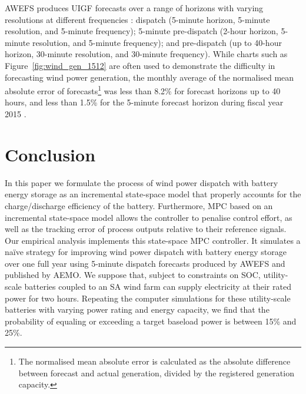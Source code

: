 AWEFS produces UIGF forecasts over a range of horizons with varying resolutions at different frequencies \citeyearpar[AEMO,][]{AEMO14b}: dispatch (5-minute horizon, 5-minute resolution, and 5-minute frequency); 5-minute pre-dispatch (2-hour horizon, 5-minute resolution, and 5-minute frequency); and pre-dispatch (up to 40-hour horizon, 30-minute resolution, and 30-minute frequency).  While charts such as Figure~\ref{fig:wind_gen_1512} are often used to demonstrate the difficulty in forecasting wind power generation, the monthly average of the normalised mean absolute error of forecasts\footnote{
The normalised mean absolute error is calculated as the absolute difference between forecast and actual generation, divided by the registered generation capacity.
} was less than 8.2\% for forecast horizons up to 40 hours, and less than 1.5\% for the 5-minute forecast horizon during fiscal year 2015 \citeyearpar[AEMO,][]{SAWSR15}.  


\section{Conclusion}\label{sect:conclusion}
In this paper we formulate the process of wind power dispatch with battery energy storage as an incremental state-space model that properly accounts for the charge/discharge efficiency of the battery.  Furthermore, MPC based on an incremental state-space model allows the controller to penalise control effort, as well as the tracking error of process outputs relative to their reference signals.  Our empirical analysis implements this state-space MPC controller.  It simulates a na\"ive strategy for improving wind power dispatch with battery energy storage over one full year using 5-minute dispatch forecasts produced by AWEFS and published by AEMO.  We suppose that, subject to constraints on SOC, utility-scale batteries coupled to an SA wind farm can supply electricity at their rated power for two hours.  Repeating the computer simulations for these utility-scale batteries with varying power rating and energy capacity, we find that the probability of equaling or exceeding a target baseload power is between 15\% and 25\%.  

